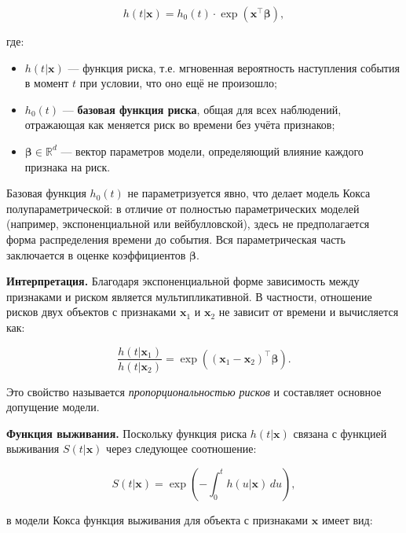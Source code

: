 \documentclass[a4paper,14pt,oneside,openany]{memoir}
\begin{document}
\begin{equation}
	h(t|\mathbf{x}) = h_0(t) \cdot \exp(\mathbf{x}^\top \boldsymbol{\beta}),
\end{equation}

где:
\begin{itemize}
	\item $h(t|\mathbf{x})$ — функция риска, т.е. мгновенная вероятность наступления события в момент $t$ при условии, что оно ещё не произошло;
	\item $h_0(t)$ — \textbf{базовая функция риска}, общая для всех наблюдений, отражающая как меняется риск во времени без учёта признаков;
	\item $\boldsymbol{\beta} \in \mathbb{R}^d$ — вектор параметров модели, определяющий влияние каждого признака на риск.
\end{itemize}

Базовая функция $h_0(t)$ не параметризуется явно, что делает модель Кокса полупараметрической: в отличие от полностью параметрических моделей (например, экспоненциальной или вейбулловской), здесь не предполагается форма распределения времени до события. Вся параметрическая часть заключается в оценке коэффициентов $\boldsymbol{\beta}$.

\vspace{1em}
\noindent
\textbf{Интерпретация.} Благодаря экспоненциальной форме зависимость между признаками и риском является мультипликативной. В частности, отношение рисков двух объектов с признаками $\mathbf{x}_1$ и $\mathbf{x}_2$ не зависит от времени и вычисляется как:

\begin{equation}
	\frac{h(t|\mathbf{x}_1)}{h(t|\mathbf{x}_2)} = \exp\left((\mathbf{x}_1 - \mathbf{x}_2)^\top \boldsymbol{\beta}\right).
\end{equation}

Это свойство называется \textit{пропорциональностью рисков} и составляет основное допущение модели.

\vspace{1em}
\noindent
\textbf{Функция выживания.} Поскольку функция риска $h(t|\mathbf{x})$ связана с функцией выживания $S(t|\mathbf{x})$ через следующее соотношение:

\begin{equation}
	S(t|\mathbf{x}) = \exp\left(-\int_0^t h(u|\mathbf{x}) \, du \right),
\end{equation}

в модели Кокса функция выживания для объекта с признаками $\mathbf{x}$ имеет вид:
\end{document}

